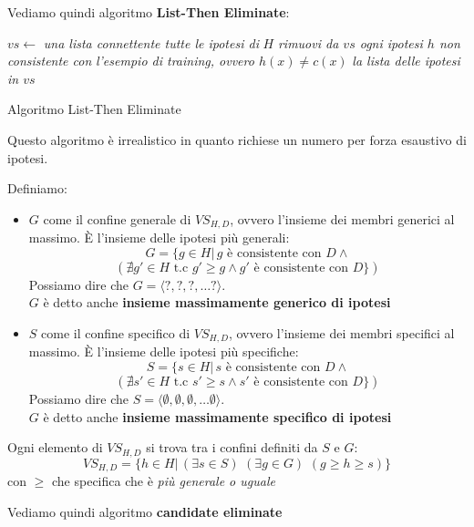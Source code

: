 \documentclass[a4paper,12pt, oneside]{book}
\begin{document}
Vediamo quindi algoritmo \textbf{List-Then Eliminate}:
\begin{algorithm}[H]
  \begin{algorithmic}
    \State $vs \gets$ \textit{una lista connettente tutte le ipotesi di } $H$
    \State \textit{rimuovi da $vs$ ogni ipotesi $h$ non consistente con}
    \State \textit{l'esempio di training, ovvero $h(x)\neq c(x)$}
    \EndFor
    \Return \textit{la lista delle ipotesi in $vs$}
    \EndFunction
  \end{algorithmic}
  \caption{Algoritmo List-Then Eliminate}
\end{algorithm}
Questo algoritmo è irrealistico in quanto richiese un numero per forza esaustivo
di ipotesi.
\begin{definizione}
  Definiamo:
  \begin{itemize}
    \item $G$ come il confine generale di $VS_{H,D}$, ovvero l'insieme dei
    membri generici al massimo. È l'insieme delle ipotesi più generali:
    \[G=\{g\in H|\, g\mbox{ è consistente con }D \land\]
    \[ (\nexists g'\in H \mbox{ t.c } g'\geq g \land g'\mbox{ è consistente con
      }D\})\]
    Possiamo dire che $G=\langle ?,?,?,\ldots ?\rangle$.\\
    $G$ è detto anche \textbf{insieme massimamente generico di ipotesi}
    \item $S$ come il confine specifico di $VS_{H,D}$, ovvero l'insieme dei
    membri specifici al massimo. È l'insieme delle ipotesi più specifiche:
     \[S=\{s\in H|\, s\mbox{ è consistente con }D \land\]
    \[ (\nexists s'\in H \mbox{ t.c } s'\geq s \land s'\mbox{ è consistente con
      }D\})\]
    Possiamo dire che $S=\langle \emptyset,\emptyset,\emptyset,\ldots \emptyset
    \rangle$.\\
        $G$ è detto anche \textbf{insieme massimamente specifico di ipotesi}

      \end{itemize}
    \end{definizione}
    \begin{teorema}
      Ogni elemento di $VS_{H,D}$ si trova tra i confini definiti da $S$ e $G$:
      \[VS_{H,D}=\{h\in H|\,(\exists s\in S)\,\,(\exists g\in G)\,\,(g\geq h\geq
        s)\}\]
      con $\geq$ che specifica che è \textit{più generale o uguale}
    \end{teorema}
    Vediamo quindi algoritmo \textbf{candidate eliminate}
\end{document}
